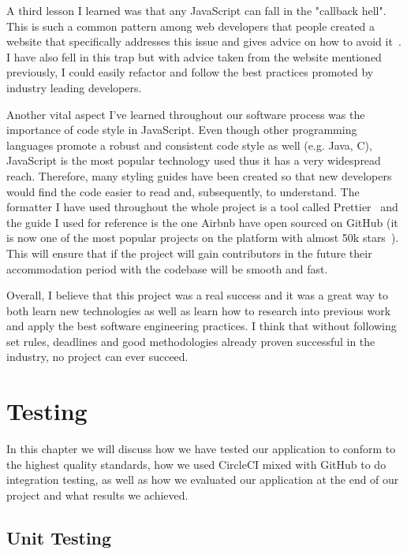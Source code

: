 \documentclass{l4proj}
\begin{document}
A third lesson I learned was that any JavaScript can fall in the "callback hell". This is such a common pattern among
web developers that people created a website that specifically addresses this issue and gives advice on how to avoid
it~\cite{callback-hell}. I have also fell in this trap but with advice taken from the website mentioned previously, I
could easily refactor and follow the best practices promoted by industry leading developers.

Another vital aspect I've learned throughout our software process was the importance of code style in JavaScript. Even
though other programming languages promote a robust and consistent code style as well (e.g. Java, C), JavaScript is the
most popular technology used thus it has a very widespread reach. Therefore, many styling guides have been created so
that new developers would find the code easier to read and, subsequently, to understand. The formatter I have used throughout
the whole project is a tool called Prettier~\cite{prettier} and the guide I used for reference is the one Airbnb have
open sourced on GitHub (it is now one of the most popular projects on the platform with almost 50k
stars~\cite{airbnb-style-guide}). This will ensure that if the project will gain contributors in the future their
accommodation period with the codebase will be smooth and fast.

Overall, I believe that this project was a real success and it was a great way to both learn new technologies as well as
learn how to research into previous work and apply the best software engineering practices. I think that without
following set rules, deadlines and good methodologies already proven successful in the industry, no project can ever
succeed.


\chapter{Testing}
\label{testing}

In this chapter we will discuss how we have tested our application to conform to the highest quality standards, how we used
CircleCI mixed with GitHub to do integration testing, as well as how we evaluated our application at the end of our
project and what results we achieved.

\section{Unit Testing}
\end{document}
